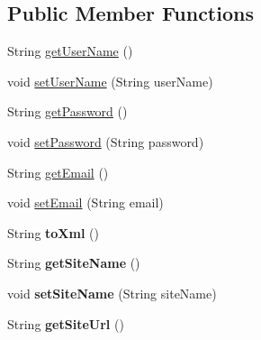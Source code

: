 \subsection*{Public Member Functions}
\begin{DoxyCompactItemize}
\item 
String \hyperlink{classcom_1_1github_1_1walterfan_1_1gtd_1_1model_1_1Account_acebe7fcd66c00569d05b522aff45df1d}{get\-User\-Name} ()
\item 
void \hyperlink{classcom_1_1github_1_1walterfan_1_1gtd_1_1model_1_1Account_a439d336f89b4fa9d300f839c0c84cd4b}{set\-User\-Name} (String user\-Name)
\item 
String \hyperlink{classcom_1_1github_1_1walterfan_1_1gtd_1_1model_1_1Account_a30b5e49f894fac9c2d8768e1d6af9754}{get\-Password} ()
\item 
void \hyperlink{classcom_1_1github_1_1walterfan_1_1gtd_1_1model_1_1Account_ac4f3dcd5830b8ea46d3baf850be762ab}{set\-Password} (String password)
\item 
String \hyperlink{classcom_1_1github_1_1walterfan_1_1gtd_1_1model_1_1Account_af4348da0ca9d60c7ac22c98909a48b6e}{get\-Email} ()
\item 
void \hyperlink{classcom_1_1github_1_1walterfan_1_1gtd_1_1model_1_1Account_ad8b537f30d7aef17335055d6fdb638b7}{set\-Email} (String email)
\item 
\hypertarget{classcom_1_1github_1_1walterfan_1_1gtd_1_1model_1_1Account_a924d8d80500d6a18c7bc3132ce65872b}{String {\bfseries to\-Xml} ()}\label{classcom_1_1github_1_1walterfan_1_1gtd_1_1model_1_1Account_a924d8d80500d6a18c7bc3132ce65872b}

\item 
\hypertarget{classcom_1_1github_1_1walterfan_1_1gtd_1_1model_1_1Account_a568a57aef35d6860c2a5066c4b7a8240}{String {\bfseries get\-Site\-Name} ()}\label{classcom_1_1github_1_1walterfan_1_1gtd_1_1model_1_1Account_a568a57aef35d6860c2a5066c4b7a8240}

\item 
\hypertarget{classcom_1_1github_1_1walterfan_1_1gtd_1_1model_1_1Account_ac414b3eaac18d17a03c8c421b4187fb8}{void {\bfseries set\-Site\-Name} (String site\-Name)}\label{classcom_1_1github_1_1walterfan_1_1gtd_1_1model_1_1Account_ac414b3eaac18d17a03c8c421b4187fb8}

\item 
\hypertarget{classcom_1_1github_1_1walterfan_1_1gtd_1_1model_1_1Account_a6628cc4464884740c70f0b9e1428d05e}{String {\bfseries get\-Site\-Url} ()}\label{classcom_1_1github_1_1walterfan_1_1gtd_1_1model_1_1Account_a6628cc4464884740c70f0b9e1428d05e}


\end{DoxyCompactItemize}
